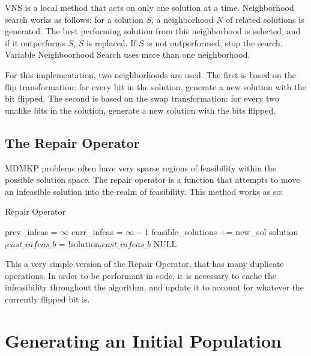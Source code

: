 \documentclass[11pt, letterpaper, onecolumn]{article}
\begin{document}
VNS is a local method that acts on only one solution at a time. Neighborhood search works as follows: for a solution $S$, a neighborhood $N$ of related solutions is generated. The best performing solution from this neighborhood is selected, and if it outperforms $S$, $S$ is replaced. If $S$ is not outperformed, stop the search. Variable Neighboorhood Search uses more than one neighborhood. 

For this implementation, two neighborhoods are used. The first is based on the flip transformation: for every bit in the solution, generate a new solution with the bit flipped. The second is based on the swap transformation: for every two unalike bits in the solution, generate a new solution with the bits flipped.  

\subsection{The Repair Operator}

MDMKP problems often have very sparse regions of feasibility within the possible solution space. The repair operator is a function that attempts to move an infeasible solution into the realm of feasibility. This method works as so:  

\begin{algorithm}
\caption{Repair Operator}
\begin{algorithmic}
\STATE prev\_infeas = $\infty$
\STATE curr\_infeas = $\infty-1$
\STATE feasible\_solutions += new\_sol
\ENDIF
\ENDIF
\ENDFOR
{}
\ENDIF
\STATE solution$_least\_infeas\_b$ = !solution$_least\_infeas\_b$
\ENDWHILE
\RETURN NULL
\end{algorithmic}
\end{algorithm}

This a very simple version of the Repair Operator, that has many duplicate operations. In order to be performant in code, it is necessary to cache the infeasibility throughout the algorithm, and update it to account for whatever the currently flipped bit is. 

\section{Generating an Initial Population}
\end{document}
